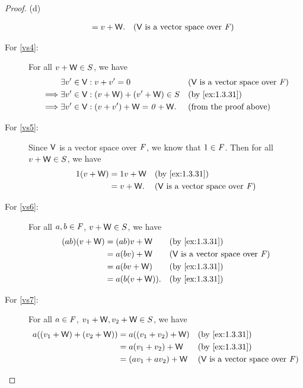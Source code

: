 \begin{proof}{(d)}
\begin{description}
\begin{align*}
                              & = v + \mathsf{W}.        &  & \text{(\(\mathsf{V}\) is a vector space over \(\mathit{F}\))}
      \end{align*}
    \item[For \ref{vs4}:]
      For all \(v + \mathsf{W} \in S\), we have
      \begin{align*}
                 & \exists v' \in \V : v + v' = 0                 &  & \text{(\(\V\) is a vector space over \(\F\))} \\
        \implies & \exists v' \in \V : (v + \W) + (v' + \W) \in S &  & \text{(by \cref{ex:1.3.31})}                  \\
        \implies & \exists v' \in \V : (v + v') + \W = \zv + \W.  &  & \text{(from the proof above)}
      \end{align*}
    \item[For \ref{vs5}:]
      Since \(\mathsf{V}\) is a vector space over \(\mathit{F}\), we know that \(1 \in \mathit{F}\).
      Then for all \(v + \mathsf{W} \in S\), we have
      \begin{align*}
        1(v + \W) & = 1v + \W &  & \text{(by \cref{ex:1.3.31})}                  \\
                  & = v + \W. &  & \text{(\(\V\) is a vector space over \(\F\))}
      \end{align*}
    \item[For \ref{vs6}:]
      For all \(a, b \in \mathit{F}\), \(v + \mathsf{W} \in S\), we have
      \begin{align*}
        (ab) (v + \W) & = (ab)v + \W    &  & \text{(by \cref{ex:1.3.31})}                  \\
                      & = a(bv) + \W    &  & \text{(\(\V\) is a vector space over \(\F\))} \\
                      & = a(bv + \W)    &  & \text{(by \cref{ex:1.3.31})}                  \\
                      & = a(b(v + \W)). &  & \text{(by \cref{ex:1.3.31})}
      \end{align*}
    \item[For \ref{vs7}:]
      For all \(a \in \mathit{F}\), \(v_1 + \mathsf{W}, v_2 + \mathsf{W} \in S\), we have
      \begin{align*}
        a((v_1 + \W) + (v_2 + \W)) & = a((v_1 + v_2) + \W)        &  & \text{(by \cref{ex:1.3.31})}                  \\
                                   & = a(v_1 + v_2) + \W          &  & \text{(by \cref{ex:1.3.31})}                  \\
                                   & = (av_1 + av_2) + \W         &  & \text{(\(\V\) is a vector space over \(\F\))} \\

\end{align*}
\end{description}
\end{proof}
